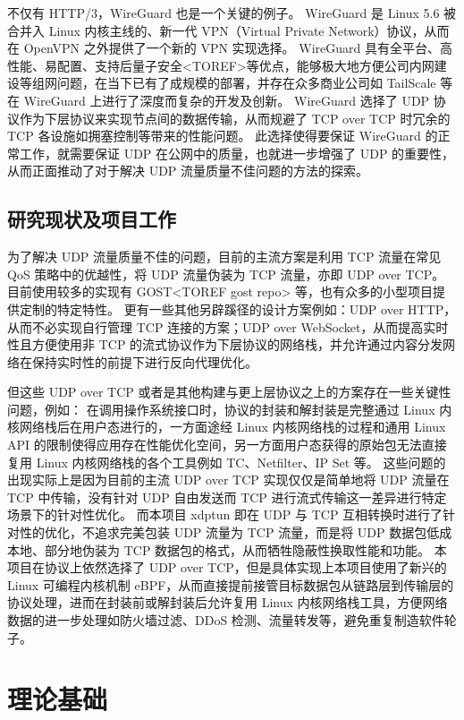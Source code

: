 不仅有 HTTP/3，WireGuard 也是一个关键的例子。
WireGuard 是 Linux 5.6 被合并入 Linux 内核主线的、新一代 VPN（Virtual Private Network）协议，从而在 OpenVPN 之外提供了一个新的 VPN 实现选择。
WireGuard 具有全平台、高性能、易配置、支持后量子安全<TOREF>等优点，能够极大地方便公司内网建设等组网问题，在当下已有了成规模的部署，并存在众多商业公司如 TailScale 等在 WireGuard 上进行了深度而复杂的开发及创新。
WireGuard 选择了 UDP 协议作为下层协议来实现节点间的数据传输，从而规避了 TCP over TCP 时冗余的 TCP 各设施如拥塞控制等带来的性能问题。
此选择使得要保证 WireGuard 的正常工作，就需要保证 UDP 在公网中的质量，也就进一步增强了 UDP 的重要性，从而正面推动了对于解决 UDP 流量质量不佳问题的方法的探索。

\section{研究现状及项目工作}

为了解决 UDP 流量质量不佳的问题，目前的主流方案是利用 TCP 流量在常见 QoS 策略中的优越性，将 UDP 流量伪装为 TCP 流量，亦即 UDP over TCP。
目前使用较多的实现有 GOST<TOREF gost repo> 等，也有众多的小型项目提供定制的特定特性。
更有一些其他另辟蹊径的设计方案例如：UDP over HTTP，从而不必实现自行管理 TCP 连接的方案；UDP over WebSocket，从而提高实时性且方便使用非 TCP 的流式协议作为下层协议的网络栈，并允许通过内容分发网络在保持实时性的前提下进行反向代理优化。

但这些 UDP over TCP 或者是其他构建与更上层协议之上的方案存在一些关键性问题，例如：
在调用操作系统接口时，协议的封装和解封装是完整通过 Linux 内核网络栈后在用户态进行的，一方面途经 Linux 内核网络栈的过程和通用 Linux API 的限制使得应用存在性能优化空间，另一方面用户态获得的原始包无法直接复用 Linux 内核网络栈的各个工具例如 TC、Netfilter、IP Set 等。
这些问题的出现实际上是因为目前的主流 UDP over TCP 实现仅仅是简单地将 UDP 流量在 TCP 中传输，没有针对 UDP 自由发送而 TCP 进行流式传输这一差异进行特定场景下的针对性优化。
而本项目 xdptun 即在 UDP 与 TCP 互相转换时进行了针对性的优化，不追求完美包装 UDP 流量为 TCP 流量，而是将 UDP 数据包低成本地、部分地伪装为 TCP 数据包的格式，从而牺牲隐蔽性换取性能和功能。
本项目在协议上依然选择了 UDP over TCP，但是具体实现上本项目使用了新兴的 Linux 可编程内核机制 eBPF，从而直接提前接管目标数据包从链路层到传输层的协议处理，进而在封装前或解封装后允许复用 Linux 内核网络栈工具，方便网络数据的进一步处理如防火墙过滤、DDoS 检测、流量转发等，避免重复制造软件轮子。

\chapter{理论基础}

